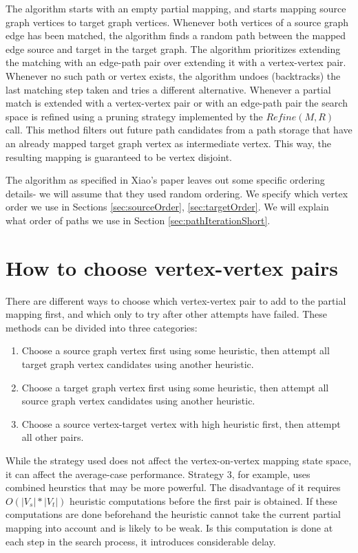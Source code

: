 The algorithm starts with an empty partial mapping, and starts mapping source graph vertices to target graph vertices. Whenever both vertices of a source graph edge has been matched, the algorithm finds a random path between the mapped edge source and target in the target graph. The algorithm prioritizes extending the matching with an edge-path pair over extending it with a vertex-vertex pair. Whenever no such path or vertex exists, the algorithm undoes (backtracks) the last matching step taken and tries a different alternative. Whenever a partial match is extended with a vertex-vertex pair or with an edge-path pair the search space is refined using a pruning strategy implemented by the $Refine(M,R)$ call. This method filters out future path candidates from a path storage that have an already mapped target graph vertex as intermediate vertex. This way, the resulting mapping is guaranteed to be vertex disjoint.

The algorithm as specified in Xiao's paper leaves out some specific ordering details- we will assume that they used random ordering. We specify which vertex order we use in Sections \ref{sec:sourceOrder}, \ref{sec:targetOrder}. We will explain what order of paths we use in Section \ref{sec:pathIterationShort}.

\section{How to choose vertex-vertex pairs}
There are different ways to choose which vertex-vertex pair to add to the partial mapping first, and which only to try after other attempts have failed. These methods can be divided into three categories:

\begin{enumerate}
\item Choose a source graph vertex first using some heuristic, then attempt all target graph vertex candidates using another heuristic.
\item Choose a target graph vertex first using some heuristic, then attempt all source graph vertex candidates using another heuristic.
\item Choose a source vertex-target vertex with high heuristic first, then attempt all other pairs.
\end{enumerate}

While the strategy used does not affect the vertex-on-vertex mapping state space, it can affect the average-case performance. Strategy 3, for example, uses combined heurstics that may be more powerful. The disadvantage of it requires $O(|V_s|*|V_t|)$ heuristic computations before the first pair is obtained. If these computations are done beforehand the heuristic cannot take the current partial mapping into account and is likely to be weak. Is this computation is done at each step in the search process, it introduces considerable delay.

